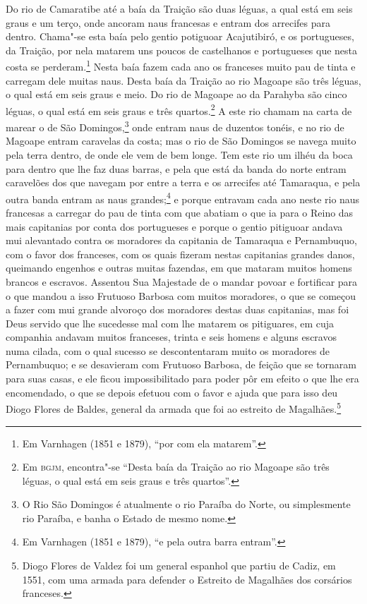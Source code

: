 Do rio de Camaratibe até a baía da Traição são duas léguas, a qual está em seis graus e um
terço, onde ancoram naus francesas e entram dos arrecifes para dentro. Chama"-se esta baía
pelo gentio potiguoar Acajutibiró, e os portugueses, da Traição, por nela matarem uns
poucos de castelhanos e portugueses que nesta costa se perderam.\footnote{ Em Varnhagen
(1851 e 1879), ``por com ela matarem''.} Nesta baía fazem cada ano os franceses muito pau
de tinta e carregam dele muitas naus. Desta baía da Traição ao rio Magoape são três
léguas, o qual está em seis graus e meio. Do rio de Magoape ao da Parahyba são cinco
léguas, o qual está em seis graus e três quartos.\footnote{ Em \textsc{bgjm}, encontra"-se
``Desta baía da Traição ao rio Magoape são três léguas, o qual está em seis graus e três
quartos''.} A este rio chamam na carta de marear o de São Domingos,\footnote{ O Rio São
Domingos é atualmente o rio Paraíba do Norte, ou simplesmente rio Paraíba, e banha o
Estado de mesmo nome.} onde entram naus de duzentos tonéis, e no rio de Magoape entram
caravelas da costa; mas o rio de São Domingos se navega muito pela terra dentro, de onde
ele vem de bem longe. Tem este rio um ilhéu da boca para dentro que lhe faz duas barras, e
pela que está da banda do norte entram caravelões dos que navegam por entre a terra e os
arrecifes até Tamaraqua, e pela outra banda entram as naus grandes;\footnote{ Em Varnhagen
(1851 e 1879), ``e pela outra barra entram''.} e porque entravam cada ano neste rio naus
francesas a carregar do pau de tinta com que abatiam o que ia para o Reino das mais
capitanias por conta dos portugueses e porque o gentio pitiguoar andava mui alevantado
contra os moradores da capitania de Tamaraqua e Pernambuquo, com o favor dos franceses,
com os quais fizeram nestas capitanias grandes danos, queimando engenhos e outras muitas
fazendas, em que mataram muitos homens brancos e escravos. Assentou Sua Majestade de o
mandar povoar e fortificar para o que mandou a isso Frutuoso Barbosa com muitos moradores,
o que se começou a fazer com mui grande alvoroço dos moradores destas duas capitanias, mas
foi Deus servido que lhe sucedesse mal com lhe matarem os pitiguares, em cuja companhia
andavam muitos franceses, trinta e seis homens e alguns escravos numa cilada, com o qual
sucesso se descontentaram muito os moradores de Pernambuquo; e se desavieram com Frutuoso
Barbosa, de feição que se tornaram para suas casas, e ele ficou impossibilitado para poder
pôr em efeito o que lhe era encomendado, o que se depois efetuou com o favor e ajuda que
para isso deu Diogo Flores de Baldes, general da armada que foi ao estreito de
Magalhães.\footnote{ Diogo Flores de Valdez foi um general espanhol que partiu de Cadiz,
em 1551, com uma armada para defender o Estreito de Magalhães dos corsários franceses.}


